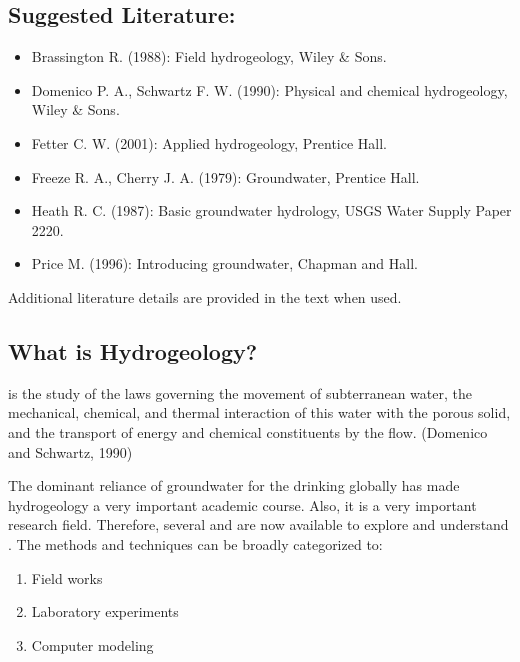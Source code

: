 \documentclass[letterpaper,10pt,english]{sphinxmanual}
\begin{document}
\subsection{Suggested Literature:}
\label{\detokenize{contents/background/03_basic_hydrogeology:suggested-literature}}\begin{itemize}
\item {} 
Brassington R. (1988): Field hydrogeology, Wiley \& Sons.

\item {} 
Domenico P. A., Schwartz F. W. (1990): Physical and chemical hydrogeology, Wiley \& Sons.

\item {} 
Fetter C. W. (2001): Applied hydrogeology, Prentice Hall.

\item {} 
Freeze R. A., Cherry J. A. (1979): Groundwater, Prentice Hall.

\item {} 
Heath R. C. (1987): Basic groundwater hydrology, USGS Water Supply Paper 2220.

\item {} 
Price M. (1996): Introducing groundwater, Chapman and Hall.

\end{itemize}

Additional literature details are provided in the text when used.


\subsection{What is Hydrogeology?}
\label{\detokenize{contents/background/03_basic_hydrogeology:what-is-hydrogeology}}
 is the study of the laws governing the movement of subterranean water, the mechanical, chemical, and thermal interaction of this water with the porous solid, and the transport of energy and chemical constituents by the flow.
(Domenico and Schwartz, 1990)

The dominant reliance of groundwater for the drinking globally has made hydrogeology a very important academic course. Also, it is a very important research field. Therefore, several  and  are now available to explore and understand . The methods and techniques can be broadly categorized to:
\begin{enumerate}
%
\item {} 
Field works

\item {} 
Laboratory experiments

\item {} 
Computer modeling

\end{enumerate}
\end{document}
